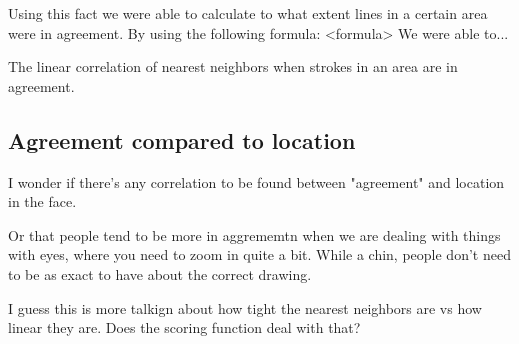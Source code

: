 Using this fact we were able to calculate to what extent lines in a certain area were in agreement. By using the following formula:
<formula>
We were able to...

The linear correlation of nearest neighbors when strokes in an area are in agreement.

\subsection{Agreement compared to location}
I wonder if there's any correlation to be found between "agreement" and location in the face.

Or that people tend to be more in aggrememtn when we are dealing with things with eyes, where you need to zoom in quite a bit. While a chin, people don't need to be as exact to have about the correct drawing. 

I guess this is more talkign about how tight the nearest neighbors are vs how linear they are. Does the scoring function deal with that?


